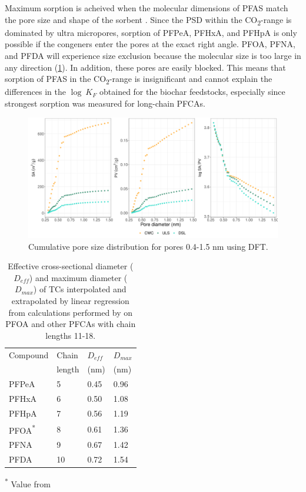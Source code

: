 Maximum sorption is acheived when the molecular dimensions of PFAS match the pore size and shape of the sorbent \citep{Hale2016}. Since the PSD within the CO\textsubscript{2}-range is dominated by ultra micropores, sorption of PFPeA, PFHxA, and PFHpA is only possible if the congeners enter the pores at the exact right angle. PFOA, PFNA, and PFDA will experience size exclusion because the molecular size is too large in any direction (\cref{tab:molecsize}). In addition, these pores are easily blocked. This means that sorption of PFAS in the CO\textsubscript{2}-range is insignificant and cannot explain the differences in the $\log~K_F$ obtained for the biochar feedstocks, especially since strongest sorption was measured for long-chain PFCAs.

\begin{figure}[htb]
    \centering
    \includegraphics[width=\textwidth]{R/figs/PZD_SAPV_C_small_plot.pdf}
    \caption{Cumulative pore size distribution for pores 0.4-1.5 nm using DFT.}
    \label{fig:PZD_small}
\end{figure}

\begin{table}
\caption{Effective cross-sectional diameter ($D_{eff}$) and maximum diameter ($D_{max}$) of TCs interpolated and extrapolated by linear regression from calculations performed by \cite{inoue2012size} on PFOA and other PFCAs with chain lengths 11-18.}
\centering
\begin{threeparttable}
\label{tab:molecsize}
\begin{tabular}{llll}
\toprule
Compound & Chain & $D_{eff}$ & $D_{max}$ \\ 
& length & (nm) & (nm) \\ \midrule
PFPeA & 5  & 0.45  & 0.96  \\
PFHxA & 6  & 0.50  & 1.08  \\
PFHpA & 7  & 0.56  & 1.19  \\
PFOA\textsuperscript{*} & 8 & 0.61 & 1.36 \\
PFNA & 9 & 0.67 & 1.42  \\
PFDA & 10 & 0.72 & 1.54  \\ \bottomrule                                    
\end{tabular}
\begin{tablenotes}
\item \textsuperscript{*} Value from \cite{inoue2012size}
\end{tablenotes}
\end{threeparttable}
\end{table}

